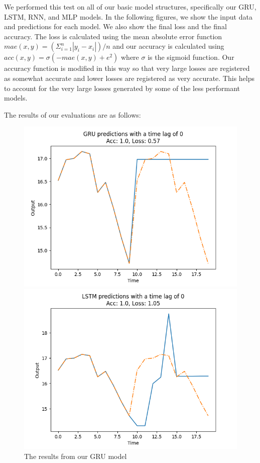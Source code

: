 \documentclass{ledger}
\begin{document}
We performed this test on all of our basic model structures, specifically our GRU, LSTM, RNN, and MLP models. In the following
figures, we show the input data and predictions for each model.  We also show the final loss and the final accuracy.
The loss is calculated using the mean absolute error function
$mae(x, y) = (\Sigma^n_{i=1} |y_i - x_i|) / n$ and our accuracy is calculated using
$acc(x, y) = \sigma(-mae(x, y)+e^2)$ where $\sigma$ is the sigmoid function.
Our accuracy function is modified in this way so that very large losses are registered as somewhat accurate and lower
losses are registered as very accurate.  This helps to account for the very large losses generated by some of the less
performant models.

The results of our evaluations are as follows:

\begin{figure}[H]
    \begin{minipage}{0.49\textwidth}
        \centering
        \includegraphics[width=\linewidth]{images/gruEval}
        \caption{The results from our GRU model}\label{Fig:gruEval}
    \end{minipage}\hfill
    \begin{minipage}{0.49\textwidth}
        \centering
        \includegraphics[width=\linewidth]{images/lstmEval}

\end{minipage}
\end{figure}
\end{document}
